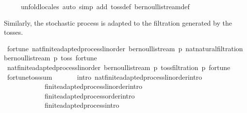 \begin{isabellebody}
\ \ \ \ \ {\isacharparenleft}{\kern0pt}unfold{\isacharunderscore}{\kern0pt}locales{\isacharcomma}{\kern0pt}\ auto\ simp\ add{\isacharcolon}{\kern0pt}\ toss{\isacharunderscore}{\kern0pt}def\ bernoulli{\isacharunderscore}{\kern0pt}stream{\isacharunderscore}{\kern0pt}def{\isacharparenright}{\kern0pt}%
\endisatagproof
{\isafoldproof}%
%
\isadelimproof
%
\endisadelimproof
%
\begin{isamarkuptext}%
Similarly, the stochastic process  is adapted to the filtration generated by the tosses.%
\end{isamarkuptext}\isamarkuptrue%
\isamarkupfalse%
\ fortune{\isacharcolon}{\kern0pt}\ nat{\isacharunderscore}{\kern0pt}finite{\isacharunderscore}{\kern0pt}adapted{\isacharunderscore}{\kern0pt}process{\isacharunderscore}{\kern0pt}linorder\ {\isachardoublequoteopen}bernoulli{\isacharunderscore}{\kern0pt}stream\ p{\isachardoublequoteclose}\ {\isachardoublequoteopen}nat{\isacharunderscore}{\kern0pt}natural{\isacharunderscore}{\kern0pt}filtration\ {\isacharparenleft}{\kern0pt}bernoulli{\isacharunderscore}{\kern0pt}stream\ p{\isacharparenright}{\kern0pt}\ toss{\isachardoublequoteclose}\ fortune\ \isanewline
%
\isadelimproof
%
\endisadelimproof
%
\isatagproof
{}\isamarkupfalse%
\ {\isacharminus}{\kern0pt}\isanewline
\ \ \isamarkupfalse%
\ {\isachardoublequoteopen}nat{\isacharunderscore}{\kern0pt}finite{\isacharunderscore}{\kern0pt}adapted{\isacharunderscore}{\kern0pt}process{\isacharunderscore}{\kern0pt}linorder\ {\isacharparenleft}{\kern0pt}bernoulli{\isacharunderscore}{\kern0pt}stream\ p{\isacharparenright}{\kern0pt}\ {\isacharparenleft}{\kern0pt}toss{\isacharunderscore}{\kern0pt}filtration\ p{\isacharparenright}{\kern0pt}\ fortune{\isachardoublequoteclose}\isanewline
\ \ \isamarkupfalse%
\ fortune{\isacharunderscore}{\kern0pt}toss{\isacharunderscore}{\kern0pt}sum\ \ \ \isanewline
\ \ \isamarkupfalse%
\ {\isacharparenleft}{\kern0pt}intro\ nat{\isacharunderscore}{\kern0pt}finite{\isacharunderscore}{\kern0pt}adapted{\isacharunderscore}{\kern0pt}process{\isacharunderscore}{\kern0pt}linorder{\isachardot}{\kern0pt}intro\ \isanewline
\ \ \ \ \ \ \ \ \ \ \ \ finite{\isacharunderscore}{\kern0pt}adapted{\isacharunderscore}{\kern0pt}process{\isacharunderscore}{\kern0pt}linorder{\isachardot}{\kern0pt}intro\ \isanewline
\ \ \ \ \ \ \ \ \ \ \ \ finite{\isacharunderscore}{\kern0pt}adapted{\isacharunderscore}{\kern0pt}process{\isacharunderscore}{\kern0pt}order{\isachardot}{\kern0pt}intro\ \isanewline
\ \ \ \ \ \ \ \ \ \ \ \ finite{\isacharunderscore}{\kern0pt}adapted{\isacharunderscore}{\kern0pt}process{\isachardot}{\kern0pt}intro\isanewline

\end{isabellebody}
